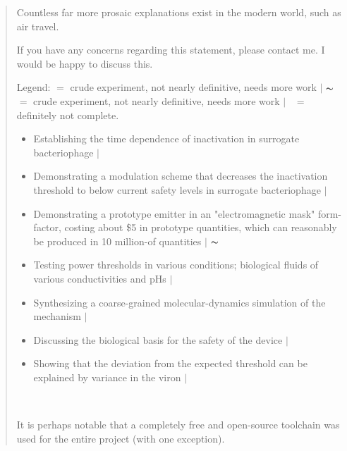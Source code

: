 \documentclass[paper.tex]{subfiles}
\begin{document}
\begin{quotation}
\begin{autem}
	Countless far more prosaic explanations exist in the modern world, such as air travel.
	
	If you have any concerns regarding this statement, please contact me. I would be happy to discuss this.
	
\end{autem}




Legend:  \cmark $ = $ crude experiment, not nearly definitive, needs more work $\vert$ $\thicksim$ $ = $ crude experiment, not nearly definitive, needs more work $\vert$ \xmark \ $ = $ definitely not complete.\\

\begin{itemize}
  \item Establishing the time dependence of inactivation in surrogate bacteriophage $\vert$ \cmark
  \item Demonstrating a modulation scheme that decreases the inactivation threshold to below current safety levels in surrogate bacteriophage $\vert$ \cmark
  \item Demonstrating a prototype emitter in an "electromagnetic mask" form-factor, costing about \$5 in prototype quantities, which can reasonably be produced in 10 million-of quantities $\vert$ $\thicksim$
  \item Testing power thresholds in various conditions; biological fluids of various conductivities and pHs $\vert$ \xmark
  \item Synthesizing a coarse-grained molecular-dynamics simulation of the mechanism $\vert$ \xmark
  \item Discussing the biological basis for the safety of the device $\vert$ \cmark
  \item Showing that the deviation from the expected threshold can be explained by variance in the viron $\vert$ \cmark
  
\end{itemize}\


\tableofcontents


It is perhaps notable that a completely free and open-source toolchain was used for the entire project (with one exception).

\end{quotation}
\end{document}
